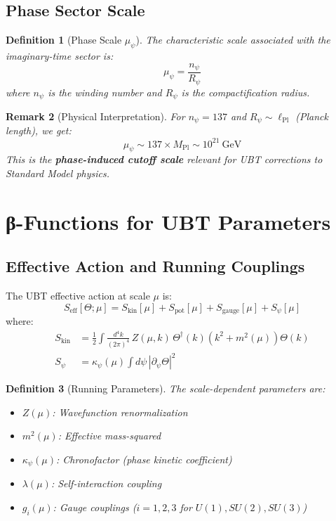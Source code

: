 \documentclass[12pt]{article}
\newtheorem{definition}{Definition}[section]
\newtheorem{remark}[definition]{Remark}
\begin{document}
\subsection{Phase Sector Scale}

\begin{definition}[Phase Scale $\mu_\psi$]
The characteristic scale associated with the imaginary-time sector is:
\begin{equation}
\mu_\psi = \frac{n_\psi}{R_\psi}
\label{eq:phase_scale}
\end{equation}
where $n_\psi$ is the winding number and $R_\psi$ is the compactification radius.
\end{definition}

\begin{remark}[Physical Interpretation]
For $n_\psi = 137$ and $R_\psi \sim \ell_{\text{Pl}}$ (Planck length), we get:
\begin{equation}
\mu_\psi \sim 137 \times M_{\text{Pl}} \sim 10^{21}~\text{GeV}
\end{equation}
This is the \textbf{phase-induced cutoff scale} relevant for UBT corrections to Standard Model physics.
\end{remark}

\section{β-Functions for UBT Parameters}
\label{sec:beta_functions}

\subsection{Effective Action and Running Couplings}

The UBT effective action at scale $\mu$ is:
\begin{equation}
S_{\text{eff}}[\Theta; \mu] = S_{\text{kin}}[\mu] + S_{\text{pot}}[\mu] + S_{\text{gauge}}[\mu] + S_{\psi}[\mu]
\end{equation}
where:
\begin{align}
S_{\text{kin}} &= \frac{1}{2} \int \frac{d^4k}{(2\pi)^4} \, Z(\mu, k) \, \Theta^\dagger(k) (k^2 + m^2(\mu)) \Theta(k) \\
S_{\psi} &= \kappa_\psi(\mu) \int d\psi \, |\partial_\psi \Theta|^2
\end{align}

\begin{definition}[Running Parameters]
The scale-dependent parameters are:
\begin{itemize}
    \item $Z(\mu)$: Wavefunction renormalization
    \item $m^2(\mu)$: Effective mass-squared
    \item $\kappa_\psi(\mu)$: Chronofactor (phase kinetic coefficient)
    \item $\lambda(\mu)$: Self-interaction coupling
    \item $g_i(\mu)$: Gauge couplings ($i = 1, 2, 3$ for $U(1), SU(2), SU(3)$)
\end{itemize}
\end{definition}
\end{document}
